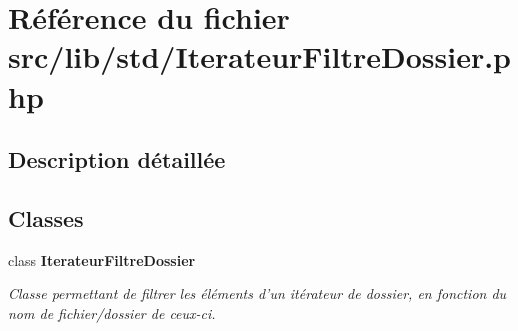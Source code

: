 \section{Référence du fichier src/lib/std/IterateurFiltreDossier.php}
\label{_iterateur_filtre_dossier_8php}


\subsection{Description détaillée}


\subsection*{Classes}
\begin{CompactItemize}
\item 
class {\bf IterateurFiltreDossier}
\begin{CompactList}\small\item\em Classe permettant de filtrer les éléments d'un itérateur de dossier, en fonction du nom de fichier/dossier de ceux-ci. \item\end{CompactList}\end{CompactItemize}
